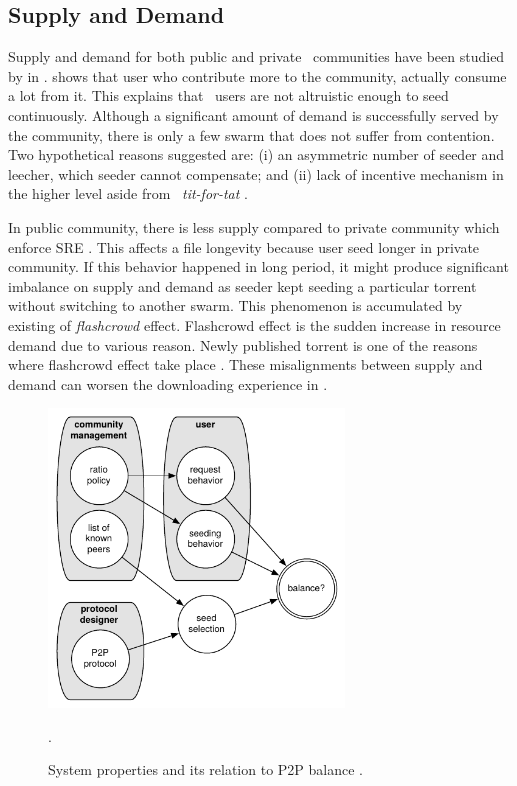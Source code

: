 \subsection{Supply and Demand}
\label{section:suppdemand}
Supply and demand for both public and private \bt~communities have been studied by \citeauthor{2009:demandsupplyres:andrade} in \citeyear{2009:demandsupplyres:andrade}. \citeauthor{2009:demandsupplyres:andrade} shows that user who contribute more to the community, actually consume a lot from it. This explains that \bt~users are not altruistic enough to seed continuously. Although a significant amount of demand is successfully served by the community, there is only a few swarm that does not suffer from contention. Two hypothetical reasons \citeauthor{2009:demandsupplyres:andrade} suggested are: (i) an asymmetric number of seeder and leecher, which seeder cannot compensate; and (ii) lack of incentive mechanism in the higher level aside from \bt~\textit{tit-for-tat} \cite{2009:demandsupplyres:andrade}. 

In public community, there is less supply compared to private community which enforce SRE \cite{2009:demandsupplyres:andrade}. This affects a file longevity because user seed longer in private community. If this behavior happened in long period, it might produce significant imbalance on supply and demand as seeder kept seeding a particular torrent without switching to another swarm. This phenomenon is accumulated by existing of \textit{flashcrowd} effect. Flashcrowd effect is the sudden increase in resource demand due to various reason. Newly published torrent is one of the reasons where flashcrowd effect take place \cite{2013:swarmevolution:su}. These misalignments between supply and demand can worsen the downloading experience in \bt.

\begin{figure}[h]
	\centering
	\includegraphics[width=0.7\textwidth]{pics/p2psys_balance.pdf}
	\caption{System properties and its relation to P2P balance \cite{2011:managesupplydemand:meulpolder}.}.
	\label{fig:sysbalance}
\end{figure}

